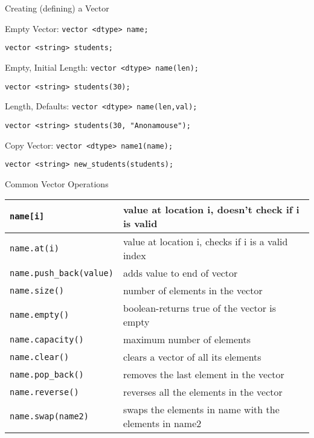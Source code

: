 \documentclass[xcolor={dvipsnames}]{beamer}
\begin{document}
\begin{frame}[fragile]{Creating (defining) a Vector}
\begin{block}{Empty Vector: \texttt{vector <dtype> name;}}
\begin{verbatim}
vector <string> students;
\end{verbatim}
\end{block}

\begin{block}{Empty, Initial Length: \texttt{vector <dtype> name(len);}}
\begin{verbatim}
vector <string> students(30);
\end{verbatim}
\end{block}

\begin{block}{Length, Defaults: \texttt{vector <dtype> name(len,val);}}
\begin{verbatim}
vector <string> students(30, "Anonamouse");
\end{verbatim}
\end{block}

\begin{block}{Copy Vector: \texttt{vector <dtype> name1(name);}}
\begin{verbatim}
vector <string> new_students(students);
\end{verbatim}
\end{block}
\end{frame}

\begin{frame}{Common Vector Operations}
\begin{tabularx}{\textwidth}{|l|X|}
\hline
\texttt{name[i]} & value at location i, doesn't check if i is valid\\
\hline
\texttt{name.at(i)} & value at location i, checks if i is a valid index\\
\hline
\texttt{name.push\_back(value)} & adds value to end of vector\\
\hline
\hline
\texttt{name.size()} & number of elements in the vector\\
\hline
\texttt{name.empty()} & boolean-returns true of the vector is empty\\
\hline
\texttt{name.capacity()} & maximum number of elements\\
\hline
\hline
\texttt{name.clear()} & clears a vector of all its elements\\
\hline
\texttt{name.pop\_back()} & removes the last element in the vector\\
\hline
\hline
\texttt{name.reverse()} & reverses all the elements in the vector\\
\hline
\texttt{name.swap(name2)} & swaps the elements in name with the elements in name2\\
\hline
\end{tabularx}
\end{frame}
\end{document}
